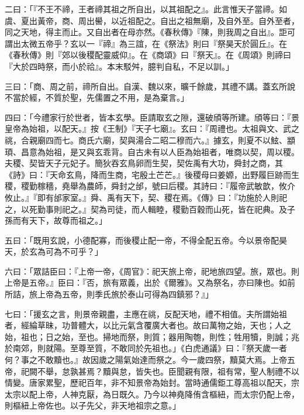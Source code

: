 \begin{pinyinscope}
 二曰：「『不王不禘，王者禘其祖之所自出，以其祖配之』。此言惟天子當禘。如虞、夏出黃帝，商、周出嚳，以近祖配之。自出之祖無廟，及自外至。自外至者，同之天地，得主而止。又自出者在母亦然。《春秋傳》『陳，則我周之自出』。詎可謂出太微五帝乎？玄以一『禘』為三誼，在《祭法》則曰『祭昊天於圓丘』。在《春秋傳》則『郊以後稷配靈威仰』。在《商頌》曰『祭天』。在《周頌》則禘曰『大於四時祭，而小於祫』。本末駁舛，臆判自私，不足以訓。」



 三曰：「商、周之前，禘所自出。自漢、魏以來，曠千餘歲，其禮不講。蓋玄所說不當於經，不質於聖，先儒置之不用，是為棄言。」



 四曰：「今禮家行於世者，皆本玄學。臣請取玄之隙，還破頎等所建。頎等曰：『景皇帝為始祖，以配天。』按《王制》『天子七廟』。玄曰：『周禮也。太祖與文、武之祧，合親廟四而七。商氏六廟，契與湯合二昭二穆而六。』據玄，則夏不以鮌、顓頊、昌意為始祖，是又與玄乖背。自古未有以人臣為始祖者，唯商以契，周以稷。夫稷、契皆天子元妃子。簡狄吞玄鳥卵而生契，契佐禹有大功，舜封之商，其《詩》曰：『天命玄鳥，降而生商，宅殷土芒芒。』後稷母曰姜嫄，出野履巨跡而生稷，稷勤稼穡，堯舉為農師，舜封之邰，號曰后稷。其詩曰：『履帝武敏歆，攸介攸止。』『即有邰家室。』舜、禹有天下，契、稷在焉。《傳》曰：『功施於人則祀之，以死勤事則祀之。』契為司徒，而人輯睦，稷勤百穀而山死，皆在祀典。及子孫而有天下，故尊而祖之。」



 五曰：「既用玄說，小德配寡，而後稷止配一帝，不得全配五帝。今以景帝配昊天，於玄為可為不可乎？」



 六曰：「眾詰臣曰：『上帝一帝，《周官》：祀天旅上帝，祀地旅四望。旅，眾也。則上帝是五帝。』臣曰：『否，旅有眾義，出於《爾雅》。又為祭名，亦曰陳也。如前所詰，旅上帝為五帝，則季氏旅於泰山可得為四鎮邪？』」



 七曰：「援玄之言，則景帝親盡，主應在祧，反配天地，禮不相值。夫所謂始祖者，經綸草昧，功普體大，以比元氣含覆廣大者也。故曰萬物之始，天也；人之始，祖也；日之始，至也。掃地而祭，則質；器用陶匏，則性；牲用犢，則誠；兆於南郊，則就陽。至尊至質，不敢同於先祖也。」《白虎通議》曰：『祭天歲一者何？事之不敢黷也。』故因歲之陽氣始達而祭之。今一歲四祭，黷莫大焉。上帝五帝，祀闕不舉，怠孰甚焉？黷與怠，皆失也。臣聞親有限，祖有常，聖人制禮不以情變。唐家累聖，歷祀百年，非不知景帝為始封。當時通儒鉅工尊高祖以配天，宗太宗以配上帝，人神克厭，為日既久。乃今以神堯降侑含樞紐，而太宗仍配上帝，則樞紐上帝佐也。以子先父，非天地祖宗之意。」




\end{pinyinscope}
